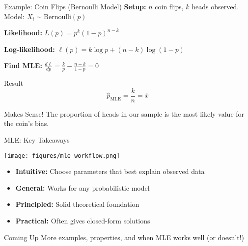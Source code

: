 \begin{frame}{Example: Coin Flips (Bernoulli Model)}
  \textbf{Setup:} \(n\) coin flips, \(k\) heads observed. Model: \(X_i \sim \text{Bernoulli}(p)\)

  \vspace{0.3em}
  \textbf{Likelihood:} \(L(p) = p^k (1-p)^{n-k}\)

  \vspace{0.3em}
  \textbf{Log-likelihood:} \(\ell(p) = k \log p + (n-k) \log(1-p)\)

  \vspace{0.3em}
  \textbf{Find MLE:} \(\frac{d\ell}{dp} = \frac{k}{p} - \frac{n-k}{1-p} = 0\)

  \vspace{0.3em}
  \begin{block}{Result}
    \[\hat{p}_{\text{MLE}} = \frac{k}{n} = \bar{x}\]
  \end{block}

  \vspace{0.2em}
  \begin{exampleblock}{Makes Sense!}
    \small The proportion of heads in our sample is the most likely value for the coin's bias.
  \end{exampleblock}
\end{frame}

\begin{frame}{MLE: Key Takeaways}
  \footnotesize
  \begin{center}
    \texttt{[image: figures/mle\_workflow.png]}
  \end{center}
  \vspace{-1.2em}
  \begin{itemize}
    \item \textbf{Intuitive:} Choose parameters that best explain observed data
    \item \textbf{General:} Works for any probabilistic model
    \item \textbf{Principled:} Solid theoretical foundation
    \item \textbf{Practical:} Often gives closed-form solutions
  \end{itemize}

  \vspace{-0.5em}
  \begin{alertblock}{Coming Up}
    \small More examples, properties, and when MLE works well (or doesn't!)
  \end{alertblock}
\end{frame}
